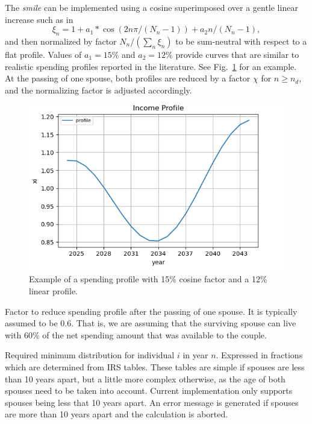 \documentclass{report}[fleqn,11pt]
\begin{document}
\begin{description}[leftmargin=4em,style=multiline]
	The {\em smile} can be implemented using a cosine superimposed over a gentle linear increase
	such as in
	\begin{equation}
		\xi_n = 1 + a_1*\cos(2n\pi/(N_n-1)) + a_2n/(N_n-1),
	\end{equation}
	and then normalized by factor $N_n/(\sum_n \xi_n )$ to be sum-neutral with respect to a flat profile.
	Values of $a_1 = 15\%$ and $a_2=12\%$ provide curves that are similar to realistic
	spending profiles reported in the literature. See Fig.~\ref{Fig:profile} for an example.
	At the passing of one spouse, both profiles are reduced by a factor $\chi$ for $n \ge n_d$,
	and the normalizing factor is adjusted accordingly.
	\begin{figure}[t]
	    \includegraphics{profile.png}
	    \caption{\small Example of a spending profile with 15\% cosine factor and a 12\% linear
	    profile. \label{Fig:profile}}
	\end{figure}
\item [$\chi$]
	Factor to reduce spending profile after the passing of one spouse. It is typically
	assumed to be 0.6. That is, we are assuming that the surviving spouse can live with
	60\% of the net spending amount that was available to the couple.
\item [$\rho_{in}$]
	Required minimum distribution for individual $i$ in year $n$. Expressed in fractions
	which are determined from IRS tables. These tables are simple if spouses are less than 10 years apart,
	but a little more complex otherwise, as the age of both spouses need to be taken into account.
	Current implementation only supports spouses being less that 10 years apart.
	An error message is generated if spouses are more than 10 years apart
        and the calculation is aborted.

\end{description}
\end{document}
